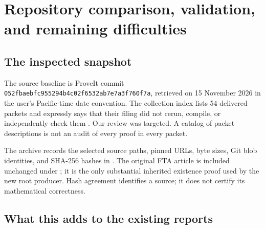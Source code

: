 \section{Repository comparison, validation, and remaining difficulties}
\label{sec:audit}

\subsection{The inspected snapshot}

The source baseline is ProveIt commit
\texttt{052fbaebfc955294b4c02f6532ab7e7a3f760f7a}, retrieved on
15 November 2026 in the user's Pacific-time date convention. The
collection index lists 54 delivered packets and expressly says that
their filing did not rerun, compile, or independently check them
\cite{repo-index}. Our review was targeted. A catalog of packet
descriptions is not an audit of every proof in every packet.

The archive records the selected source paths, pinned URLs, byte sizes,
Git blob identities, and SHA-256 hashes in
. The original FTA article is
included unchanged under ; it is the
only substantial inherited existence proof used by the new root
producer. Hash agreement identifies a source; it does not certify its
mathematical correctness.

\clearpage
\subsection{What this adds to the existing reports}

